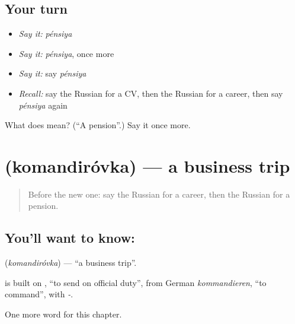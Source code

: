 \subsection*{Your turn}
\begin{itemize}
\raggedright
  \item \emph{Say it:} \emph{pénsiya}
  \item \emph{Say it:} \emph{pénsiya}, once more
  \item \emph{Say it:} say \emph{pénsiya}
  \item \emph{Recall:} say the Russian for a CV, then the Russian for a career, then say \emph{pénsiya} again
\end{itemize}

\begin{tcolorbox}[breakable,colback=teal!4,colframe=teal!35!black,title={Before you move on}]
What does  mean? (\textquotedblleft{}A pension\textquotedblright{}.) Say it once more.
\end{tcolorbox}
\section[\texorpdfstring{\ru{командировка} (komandiróvka)}{командировка (komandiróvka)}]{ (komandiróvka) — a business trip}

\label{lesson:RU-C172-komandirovka}



\begin{quote}
Before the new one: say the Russian for a career, then the Russian for a pension.
\end{quote}

\subsection*{You'll want to know: }
\textbf{} (\emph{komandiróvka}) — \textquotedblleft{}a business trip\textquotedblright{}.

\begin{cousinweb}
\textbf{} is built on \emph{}, \textquotedblleft{}to send on official duty\textquotedblright{}, from German \emph{kommandieren}, \textquotedblleft{}to command\textquotedblright{}, with \emph{-}.
\end{cousinweb}

\begin{grammarlens}[title={What you've built}]
One more word for this chapter.
\end{grammarlens}

